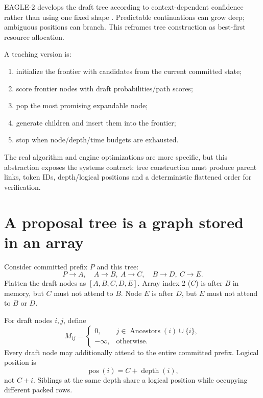 EAGLE-2 develops the draft tree according to context-dependent confidence rather than
using one fixed shape \cite{li2024eagle2}. Predictable continuations can grow deep;
ambiguous positions can branch. This reframes tree construction as best-first resource
allocation.

A teaching version is:
\begin{enumerate}
\item initialize the frontier with candidates from the current committed state;
\item score frontier nodes with draft probabilities/path scores;
\item pop the most promising expandable node;
\item generate children and insert them into the frontier;
\item stop when node/depth/time budgets are exhausted.
\end{enumerate}
The real algorithm and engine optimizations are more specific, but this abstraction
exposes the systems contract: tree construction must produce parent links, token IDs,
depth/logical positions and a deterministic flattened order for verification.

\section{A proposal tree is a graph stored in an array}

Consider committed prefix $P$ and this tree:
\[
P\rightarrow A,\quad
A\rightarrow B,\ A\rightarrow C,\quad
B\rightarrow D,\ C\rightarrow E.
\]
Flatten the draft nodes as $[A,B,C,D,E]$. Array index 2 ($C$) is after $B$ in memory,
but $C$ must not attend to $B$. Node $E$ is after $D$, but $E$ must not attend to
$B$ or $D$.

For draft nodes $i,j$, define
\begin{equation}
M_{ij}=
\begin{cases}
0,&j\in\operatorname{Ancestors}(i)\cup\{i\},\\
-\infty,&\text{otherwise}.
\end{cases}
\label{eq:tree-mask}
\end{equation}
Every draft node may additionally attend to the entire committed prefix. Logical
position is
\[
\operatorname{pos}(i)=C+\operatorname{depth}(i),
\]
not $C+i$. Siblings at the same depth share a logical position while occupying
different packed rows.


